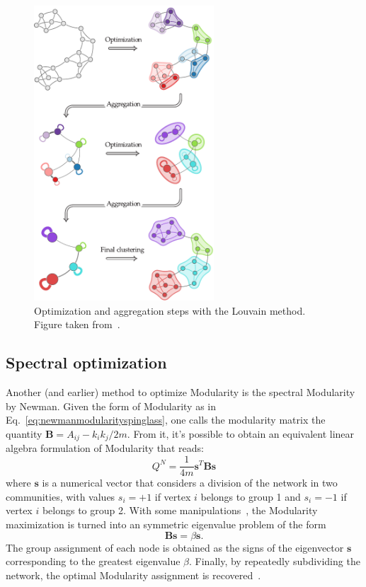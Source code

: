 \begin{figure}[htb!]
\centering
\includegraphics[width=0.6\textwidth]{images/louvain_method.pdf}
\caption{Optimization and aggregation steps with the Louvain method. Figure taken from~\cite{browet2014}.}
\label{fig:louvain_method}
\end{figure}

\subsection{Spectral optimization}
Another (and earlier) method to optimize Modularity is the spectral Modularity by Newman. Given the form of Modularity as in Eq.~\ref{eq:newmanmodularityspinglass}, one calls the modularity matrix the quantity $\mathbf{B}=A_{ij} - k_i k_j/2m$. From it, it's possible to obtain an equivalent linear algebra formulation of Modularity that reads:
\begin{equation}\label{eq:newman_spectral}
Q^N = \frac{1}{4m} \mathbf{s}^T \mathbf{B} \mathbf{s}
\end{equation}
where $\mathbf{s}$ is a numerical vector that considers a division of the network in two communities, with values $s_i=+1$ if vertex $i$ belongs to group 1 and $s_i=-1$ if vertex $i$ belongs to group 2. With some manipulations~\cite{newman2006,newman2010book}, the Modularity maximization is turned into an symmetric eigenvalue problem of the form
\begin{equation}
\mathbf{B} \mathbf{s} = \beta \mathbf{s}.
\end{equation}
The group assignment of each node is obtained as the signs of the eigenvector $\mathbf{s}$ corresponding to the greatest eigenvalue $\beta$. Finally, by repeatedly subdividing the network, the optimal Modularity assignment is recovered~\cite{newman2006,newman2010book}.

